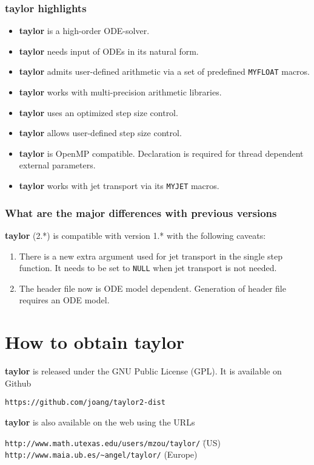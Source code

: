 \documentclass[10pt]{article}
\theoremstyle{remark}
\newcommand{\taylorname}{{\bf taylor}}
\newcommand{\myfloat}{{\tt MY\symbol{95}FLOAT}}
\newcommand{\myjet}{{\tt MY\symbol{95}JET}}
\begin{document}
\subsubsection*{\taylorname{} highlights}

\begin{itemize}
    \item \taylorname{} is a high-order ODE-solver.
    \item \taylorname{} needs input of ODEs in its natural form.
    \item \taylorname{} admits user-defined arithmetic via a set of predefined
      \myfloat{} macros.
    \item \taylorname{} works with multi-precision arithmetic libraries.
    \item \taylorname{} uses an optimized step size control.
    \item \taylorname{} allows user-defined step size control.
    \item \taylorname{} is OpenMP compatible. Declaration is required
      for thread dependent external parameters.
    \item \taylorname{} works with jet transport via its \myjet{}
      macros.
\end{itemize}

\subsubsection*{What are the major differences with previous versions}
\taylorname{} (2.*) is compatible with version 1.* with the following
caveats:
\begin{enumerate}
\renewcommand{\labelenumi}{\theenumi.)}
    \item There is a new extra argument used for jet transport in the
      single step function. It needs to be set to \verb+NULL+ when jet
      transport is not needed.
    \item The header file now is ODE model dependent. Generation of
      header file requires an ODE model.
\end{enumerate}

\section{How to obtain \taylorname{}} \label{sec:download}
\taylorname{} is released under the GNU Public License (GPL).  It is
available on Github
\begin{tabbing}
    {\tt https://github.com/joang/taylor2-dist}
\end{tabbing}
\taylorname{} is also available on the web using the URLs
\begin{tabbing}
    {\tt http://www.math.utexas.edu/users/mzou/taylor/}\hspace*{5mm} \= (US)\\
    {\verb-http://www.maia.ub.es/~angel/taylor/-} \> (Europe)
\end{tabbing}
\end{document}
